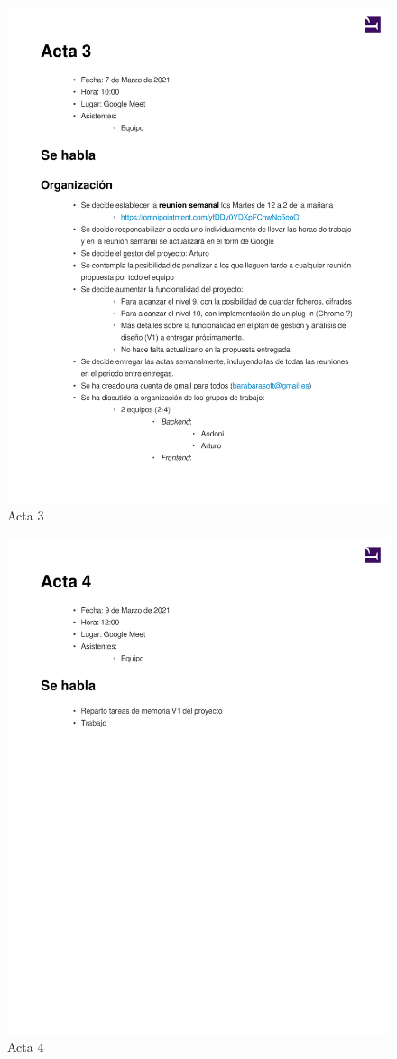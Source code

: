 \documentclass{article}
\begin{document}
\begin{figure}
    \includegraphics[width=.8\textwidth]{../../actas_reuniones/acta3.pdf}
    \caption{Acta 3}
\end{figure}
\begin{figure}
    \includegraphics[width=.8\textwidth]{../../actas_reuniones/acta4.pdf}
    \caption{Acta 4}
\end{figure}
\end{document}
